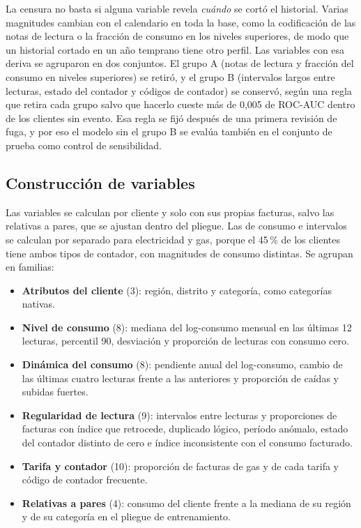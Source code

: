 La censura no basta si alguna variable revela \emph{cuándo} se cortó el historial. Varias
magnitudes cambian con el calendario en toda la base, como la codificación de las notas de
lectura o la fracción de consumo en los niveles superiores, de modo que un historial cortado
en un año temprano tiene otro perfil. Las variables con esa deriva se agruparon en dos
conjuntos. El grupo A (notas de lectura y fracción del consumo en niveles superiores) se
retiró, y el grupo B (intervalos largos entre lecturas, estado del contador y códigos de
contador) se conservó, según una regla que retira cada grupo salvo que hacerlo cueste más de
0,005 de ROC-AUC dentro de los clientes sin evento. Esa regla se fijó después de una primera
revisión de fuga, y por eso el modelo sin el grupo B se evalúa también en el conjunto de
prueba como control de sensibilidad.

\subsection{Construcción de variables}

Las variables se calculan por cliente y solo con sus propias facturas, salvo las relativas a
pares, que se ajustan dentro del pliegue. Las de consumo e intervalos se calculan por
separado para electricidad y gas, porque el 45\,\% de los clientes tiene ambos tipos de
contador, con magnitudes de consumo distintas. Se agrupan en familias:

\begin{itemize}
  \item \textbf{Atributos del cliente} (3): región, distrito y categoría, como categorías
    nativas.
  \item \textbf{Nivel de consumo} (8): mediana del log-consumo mensual en las últimas 12
    lecturas, percentil 90, desviación y proporción de lecturas con consumo cero.
  \item \textbf{Dinámica del consumo} (8): pendiente anual del log-consumo, cambio de las
    últimas cuatro lecturas frente a las anteriores y proporción de caídas y subidas fuertes.
  \item \textbf{Regularidad de lectura} (9): intervalos entre lecturas y proporciones de
    facturas con índice que retrocede, duplicado lógico, período anómalo, estado del
    contador distinto de cero e índice inconsistente con el consumo facturado.
  \item \textbf{Tarifa y contador} (10): proporción de facturas de gas y de cada tarifa y
    código de contador frecuente.
  \item \textbf{Relativas a pares} (4): consumo del cliente frente a la mediana de su región
    y de su categoría en el pliegue de entrenamiento.
\end{itemize}


